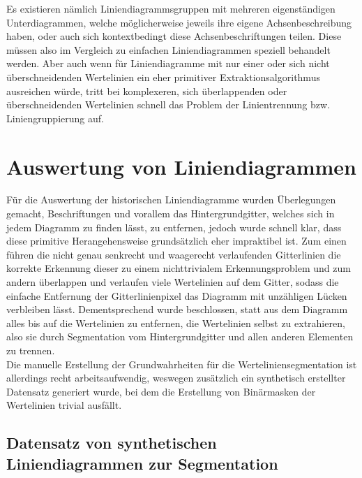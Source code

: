 Es existieren nämlich Liniendiagrammsgruppen mit mehreren eigenständigen Unterdiagrammen, welche möglicherweise jeweils ihre eigene Achsenbeschreibung haben, oder auch sich kontextbedingt diese Achsenbeschriftungen teilen. Diese müssen also im Vergleich zu einfachen Liniendiagrammen speziell behandelt werden. Aber auch wenn für Liniendiagramme mit nur einer oder sich nicht überschneidenden Wertelinien ein eher primitiver Extraktionsalgorithmus ausreichen würde, tritt bei komplexeren, sich überlappenden oder überschneidenden Wertelinien schnell das Problem der Linientrennung bzw. Liniengruppierung auf.

\clearpage

\section{Auswertung von Liniendiagrammen}

Für die Auswertung der historischen Liniendiagramme wurden Überlegungen gemacht, Beschriftungen und vorallem das Hintergrundgitter, welches sich in jedem Diagramm zu finden lässt, zu entfernen, jedoch wurde schnell klar, dass diese primitive Herangehensweise grundsätzlich eher impraktibel ist. Zum einen führen die nicht genau senkrecht und waagerecht verlaufenden Gitterlinien die korrekte Erkennung dieser zu einem nichttrivialem Erkennungsproblem und zum andern überlappen und verlaufen viele Wertelinien auf dem Gitter, sodass die einfache Entfernung der Gitterlinienpixel das Diagramm mit unzähligen Lücken verbleiben lässt. Dementsprechend wurde beschlossen, statt aus dem Diagramm alles bis auf die Wertelinien zu entfernen, die Wertelinien selbst zu extrahieren, also sie durch Segmentation vom Hintergrundgitter und allen anderen Elementen zu trennen.
\\
Die manuelle Erstellung der Grundwahrheiten für die Werteliniensegmentation ist allerdings recht arbeitsaufwendig, weswegen zusätzlich ein synthetisch erstellter Datensatz generiert wurde, bei dem die Erstellung von Binärmasken der Wertelinien trivial ausfällt.

\subsection{Datensatz von synthetischen Liniendiagrammen zur Segmentation}

